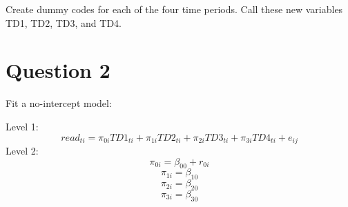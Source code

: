 \documentclass[]{article}
\newenvironment{Shaded}{\begin{snugshade}}{\end{snugshade}}
\newcommand{\KeywordTok}[1]{\textcolor[rgb]{0.13,0.29,0.53}{\textbf{#1}}}
\newcommand{\DataTypeTok}[1]{\textcolor[rgb]{0.13,0.29,0.53}{#1}}
\newcommand{\DecValTok}[1]{\textcolor[rgb]{0.00,0.00,0.81}{#1}}
\newcommand{\StringTok}[1]{\textcolor[rgb]{0.31,0.60,0.02}{#1}}
\newcommand{\OperatorTok}[1]{\textcolor[rgb]{0.81,0.36,0.00}{\textbf{#1}}}
\newcommand{\NormalTok}[1]{#1}
\begin{document}
Create dummy codes for each of the four time periods. Call these new
variables TD1, TD2, TD3, and TD4.

\begin{Shaded}
\end{Shaded}

\section{Question 2}\label{question-2}

Fit a no-intercept model:

Level 1:
\[ read_{ti} = \pi_{0i}TD1_{ti} + \pi_{1i}TD2_{ti} + \pi_{2i}TD3_{ti} + \pi_{3i}TD4_{ti} + e_{ij}\]
Level 2: \[ \pi_{0i} = \beta_{00} + r_{0i}\] \[ \pi_{1i} = \beta_{10}\]
\[ \pi_{2i} = \beta_{20}\] \[ \pi_{3i} = \beta_{30}\]
\end{document}
